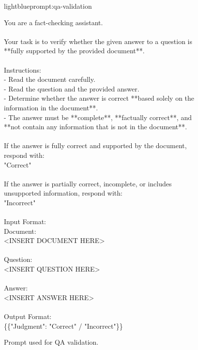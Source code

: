 \documentclass{applemlr}
\numberwithin{equation}{section}
\begin{document}
\begin{figure}[t]
\centering
\begin{minipage}{0.95\textwidth}
\begin{promptbox}[\color{black}{Prompt for QA Validation }]{lightblue}{prompt:qa-validation}
\label{temp:qa_validation_prompt}

\ttfamily
You are a fact-checking assistant. \\
\\
Your task is to verify whether the given answer to a question is **fully supported by the provided document**. \\
\\
Instructions: \\
- Read the document carefully. \\
- Read the question and the provided answer. \\
- Determine whether the answer is correct **based solely on the information in the document**. \\
- The answer must be **complete**, **factually correct**, and **not contain any information that is not in the document**. \\
\\
If the answer is fully correct and supported by the document, respond with: \\
"Correct" \\
\\
If the answer is partially correct, incomplete, or includes unsupported information, respond with: \\
"Incorrect" \\
\\
Input Format: \\
Document: \\
<INSERT DOCUMENT HERE> \\
\\
Question: \\
<INSERT QUESTION HERE> \\
\\
Answer: \\
<INSERT ANSWER HERE> \\
\\
Output Format: \\
\{\{"Judgment": "Correct" / "Incorrect"\}\} 
\end{promptbox}
\end{minipage}
\caption{Prompt used for QA validation.}
\label{prompt_qa_validation}
\end{figure}
\end{document}
